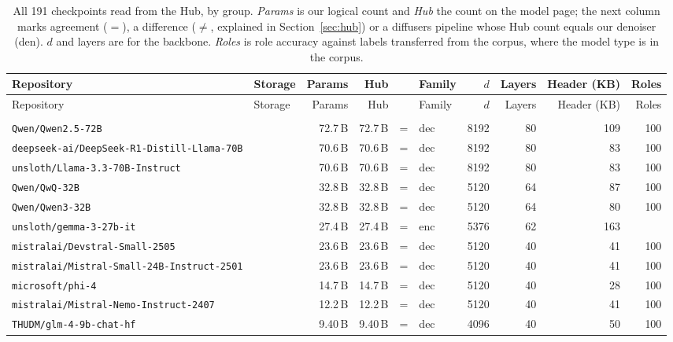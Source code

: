 \scriptsize\setlength{\tabcolsep}{2.5pt}
\begin{longtable}{@{}llrrclrrrr@{}}
\caption{All 191 checkpoints read from the Hub, by group. \emph{Params} is our logical count and \emph{Hub} the count on the model page; the next column marks agreement ($=$), a difference ($\ne$, explained in Section~\ref{sec:hub}) or a diffusers pipeline whose Hub count equals our denoiser (den). $d$ and layers are for the backbone. \emph{Roles} is role accuracy against labels transferred from the corpus, where the model type is in the corpus.}\label{tab:hub-all}\\
\toprule Repository & Storage & Params & Hub & & Family & $d$ & Layers & Header (KB) & Roles \\ \midrule\endfirsthead
\toprule Repository & Storage & Params & Hub & & Family & $d$ & Layers & Header (KB) & Roles \\ \midrule\endhead
\bottomrule\endfoot
\multicolumn{10}{@{}l}{\textbf{Dense LM} (45)} \\
{\tiny\texttt{Qwen/Qwen2.5-72B}} &  & 72.7\,B & 72.7\,B & = & dec & 8192 & 80 & 109 & 100 \\
{\tiny\texttt{deepseek-ai/DeepSeek-R1-Distill-Llama-70B}} &  & 70.6\,B & 70.6\,B & = & dec & 8192 & 80 & 83 & 100 \\
{\tiny\texttt{unsloth/Llama-3.3-70B-Instruct}} &  & 70.6\,B & 70.6\,B & = & dec & 8192 & 80 & 83 & 100 \\
{\tiny\texttt{Qwen/QwQ-32B}} &  & 32.8\,B & 32.8\,B & = & dec & 5120 & 64 & 87 & 100 \\
{\tiny\texttt{Qwen/Qwen3-32B}} &  & 32.8\,B & 32.8\,B & = & dec & 5120 & 64 & 80 & 100 \\
{\tiny\texttt{unsloth/gemma-3-27b-it}} &  & 27.4\,B & 27.4\,B & = & enc & 5376 & 62 & 163 &  \\
{\tiny\texttt{mistralai/Devstral-Small-2505}} &  & 23.6\,B & 23.6\,B & = & dec & 5120 & 40 & 41 & 100 \\
{\tiny\texttt{mistralai/Mistral-Small-24B-Instruct-2501}} &  & 23.6\,B & 23.6\,B & = & dec & 5120 & 40 & 41 & 100 \\
{\tiny\texttt{microsoft/phi-4}} &  & 14.7\,B & 14.7\,B & = & dec & 5120 & 40 & 28 & 100 \\
{\tiny\texttt{mistralai/Mistral-Nemo-Instruct-2407}} &  & 12.2\,B & 12.2\,B & = & dec & 5120 & 40 & 41 & 100 \\
{\tiny\texttt{THUDM/glm-4-9b-chat-hf}} &  & 9.40\,B & 9.40\,B & = & dec & 4096 & 40 & 50 & 100 \\

\end{longtable}
